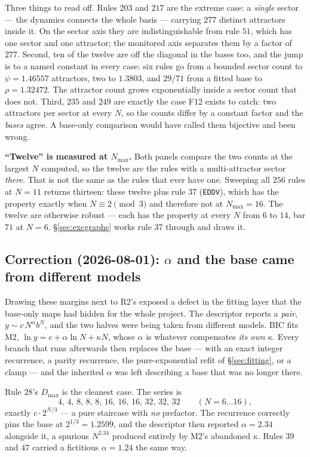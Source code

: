 \documentclass[11pt]{article}
\newcommand{\rt}[1]{\texttt{#1}}
\theoremstyle{plain}
\theoremstyle{definition}
\begin{document}
\noindent Three things to read off. Rules $203$ and $217$ are the extreme case:
a \emph{single} sector --- the dynamics connects the whole basis --- carrying
$277$ distinct attractors inside it. On the sector axis they are indistinguishable
from rule $51$, which has one sector and one attractor; the monitored axis
separates them by a factor of $277$. Second, ten of the twelve are off the
diagonal in the bases too, and the jump is to a named constant in every case:
six rules go from a bounded sector count to $\psi=1.46557$ attractors, two to
$1.3803$, and $29/71$ from a fitted base to $\rho=1.32472$. The attractor count
grows exponentially inside a sector count that does not. Third, $235$ and $249$
are exactly the case F12 exists to catch: two attractors per sector at every $N$,
so the counts differ by a constant factor and the \emph{bases} agree. A base-only
comparison would have called them bijective and been wrong.

\noindent\textbf{``Twelve'' is measured at $N_{\max}$.} Both panels compare the
two counts at the largest $N$ computed, so the twelve are the rules with a
multi-attractor sector \emph{there}. That is not the same as the rules that ever
have one. Sweeping all $256$ rules at $N=11$ returns thirteen: these twelve plus
rule $37$ (\rt{EDDV}), which has the property exactly when $N\equiv2\pmod3$ and
therefore not at $N_{\max}=16$. The twelve are otherwise robust --- each has the
property at every $N$ from $6$ to $14$, bar $71$ at $N=6$. \S\ref{sec:excgraphs}
works rule $37$ through and draws it.

\subsection{Correction (2026-08-01): $\alpha$ and the base came from different
models}
\label{sec:alphafix}

Drawing these margins next to R2's exposed a defect in the fitting layer that the
base-only maps had hidden for the whole project. The descriptor reports a
\emph{pair}, $y \sim c\,N^{\alpha} b^{N}$, and the two halves were being taken
from different models. BIC fits M2, $\ln y = c + \alpha\ln N + \kappa N$, whose
$\alpha$ is whatever compensates \emph{its own} $\kappa$. Every branch that runs
afterwards then replaces the base --- with an exact integer recurrence, a parity
recurrence, the pure-exponential refit of \S\ref{sec:fitting}, or a clamp --- and
the inherited $\alpha$ was left describing a base that was no longer there.

Rule $28$'s $D_{\max}$ is the cleanest case. The series is
\[
4,\,4,\,8,\,8,\,8,\,16,\,16,\,16,\,32,\,32,\,32 \qquad (N=6\ldots16),
\]
exactly $c\cdot 2^{N/3}$ --- a pure staircase with \emph{no} prefactor. The
recurrence correctly pins the base at $2^{1/3}=1.2599$, and the descriptor then
reported $\alpha = 2.34$ alongside it, a spurious $N^{2.34}$ produced entirely by
M2's abandoned $\kappa$. Rules $39$ and $47$ carried a fictitious $\alpha=1.24$
the same way.
\end{document}
